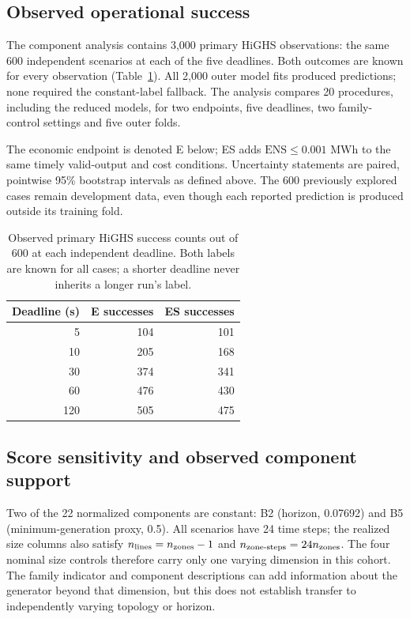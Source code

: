 \subsection{Observed operational success}
The component analysis contains 3,000 primary HiGHS observations: the same
600 independent scenarios at each of the five deadlines. Both outcomes
are known for every observation (Table~\ref{tab:p1_support}).
All 2,000 outer model fits produced predictions; none required the
constant-label fallback.
The analysis compares 20 procedures, including the reduced models, for two
endpoints, five deadlines, two family-control settings and five outer folds.

The economic endpoint is denoted E below; ES adds
$\mathrm{ENS}\leq0.001$ MWh to the same timely valid-output and cost conditions.
Uncertainty statements are paired, pointwise 95\% bootstrap intervals as
defined above. The 600 previously explored cases remain development data,
even though each reported prediction is produced outside its training fold.

\begin{table}[htbp]\centering\small
\begin{tabular}{rrr}\toprule
Deadline (s) & E successes & ES successes\\\midrule
5 & 104 & 101 \\
10 & 205 & 168 \\
30 & 374 & 341 \\
60 & 476 & 430 \\
120 & 505 & 475 \\
\bottomrule\end{tabular}
\caption{Observed primary HiGHS success counts out of 600 at each independent deadline. Both labels are known for all cases; a shorter deadline never inherits a longer run's label.}
\label{tab:p1_support}
\end{table}

\subsection{Score sensitivity and observed component support}
Two of the 22 normalized components are constant: B2 (horizon, 0.07692)
and B5 (minimum-generation proxy, 0.5). All scenarios have 24 time steps;
the realized size columns also satisfy $n_{\rm lines}=n_{\rm zones}-1$
and $n_{\rm zone\text{-}steps}=24n_{\rm zones}$. The four nominal size
controls therefore carry only one varying dimension in this cohort.
The family indicator and component descriptions can add information about
the generator beyond that dimension, but this does not establish transfer
to independently varying topology or horizon.

